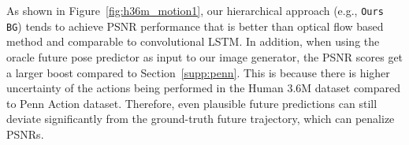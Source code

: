 \documentclass{article}
\begin{document}
\begin{appendix}

\clearpage

As shown in Figure~\ref{fig:h36m_motion1}, our hierarchical approach (e.g., \texttt{Ours BG}) tends to achieve PSNR performance that is better than optical flow based method and comparable to convolutional LSTM. In addition, when using the oracle future pose predictor as input to our image generator, the PSNR scores get a larger boost compared to Section~\ref{supp:penn}. 
This is because there is higher uncertainty of the actions being performed in the Human 3.6M dataset compared to Penn Action dataset. 
Therefore, even plausible future predictions can still deviate significantly from the ground-truth future trajectory, which can penalize PSNRs.


\end{appendix}
\end{document}
